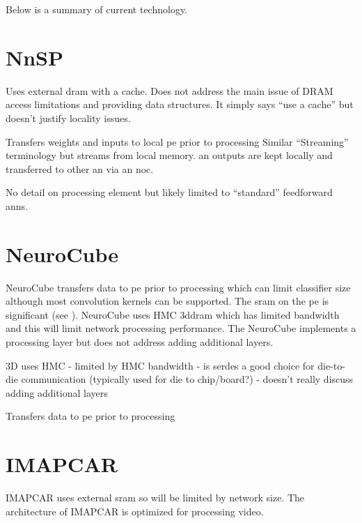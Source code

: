 {{{{Below is a summary of current technology.

\section[NnSP]{NnSP{\cite{esmaeilzadeh2005nnsp}}}

Uses external \ac{dram} with a cache.
Does not address the main issue of DRAM access limitations and providing data structures.
It simply says ``use a cache'' but doesn't justify locality issues.

Transfers weights and inputs to local \ac{pe} prior to processing
Similar ``Streaming'' terminology but streams from local memory.
\ac{an} outputs are kept locally and transferred to other \ac{an} via an  \ac{noc}.

No detail on processing element but likely limited to ``standard'' feedforward \acp{ann}.


\section[NeuroCube]{NeuroCube{\cite{kim2016neurocube}}}
NeuroCube\cite{kim2016neurocube} transfers data to \ac{pe} prior to processing which can limit classifier size although most
convolution kernels can be supported.
The \ac{sram} on the \ac{pe} is significant (see ).
NeuroCube uses HMC \ac{3ddram} which has limited bandwidth and this will limit network processing performance.
The NeuroCube implements a processing layer but does not address adding additional layers. 

3D uses HMC
 - limited by HMC bandwidth
 - is serdes a good choice for die-to-die communication (typically used for die to chip/board?)
 - doesn't really discuss adding additional layers

Transfers data to \ac{pe} prior to processing


\section[IMAPCAR]{IMAPCAR \cite{kyo2011imapcar}}
IMAPCAR uses external \ac{sram} so will be limited by network size.
The architecture of IMAPCAR is optimized for processing video.

}}}}
